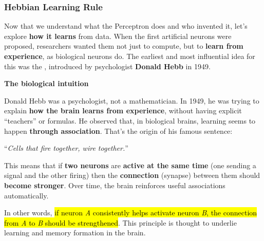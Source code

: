 \subsubsection{Hebbian Learning Rule}\label{sec:hebbian-learning-rule}

Now that we understand what the Perceptron does and who invented it, let's explore \textbf{how it learns} from data. When the first artificial neurons were proposed, researchers wanted them not just to compute, but to \textbf{learn from experience}, as biological neurons do. The earliest and most influential idea for this was the , introduced by psychologist \textbf{Donald Hebb} in 1949.

\highspace
\begin{flushleft}
    \textcolor{Green3}{ \textbf{The biological intuition}}
\end{flushleft}
Donald Hebb was a psychologist, not a mathematician. In 1949, he was trying to explain \textbf{how the brain learns from experience}, without having explicit ``teachers'' or formulas. He observed that, in biological brains, learning seems to happen \textbf{through association}. That's the origin of his famous sentence:
\begin{center}
    ``\emph{Cells that fire together, wire together.}''
\end{center}
This means that if \textbf{two neurons} are \textbf{active at the same time} (one sending a signal and the other firing) then the \textbf{connection} (synapse) between them should \textbf{become stronger}. Over time, the brain reinforces useful associations automatically.

\highspace
In other words, \hl{if neuron \emph{A} consistently helps activate neuron \emph{B}, the connection from \emph{A} to \emph{B} should be strengthened}. This principle is thought to underlie learning and memory formation in the brain.

